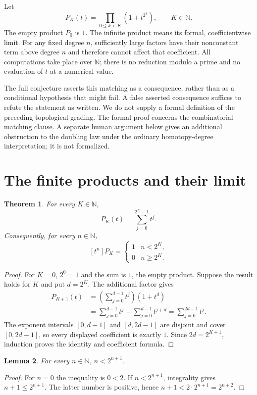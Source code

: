 \documentclass[11pt]{article}
\newtheorem{theorem}{Theorem}
\newtheorem{lemma}[theorem]{Lemma}
\newcommand{\N}{\mathbb{N}}
\newcommand{\coeff}[2]{[t^{#1}]#2}
\begin{document}
Let
\[
P_K(t)=\prod_{0\leq k<K}(1+t^{2^k}),\qquad K\in\N.
\]
The empty product $P_0$ is $1$. The infinite product means its formal, coefficientwise limit. For any fixed degree $n$, sufficiently large factors have their nonconstant term above degree $n$ and therefore cannot affect that coefficient. All computations take place over $\N$; there is no reduction modulo a prime and no evaluation of $t$ at a numerical value.

The full conjecture asserts this matching as a consequence, rather than as a conditional hypothesis that might fail. A false asserted consequence suffices to refute the statement as written. We do not supply a formal definition of the preceding topological grading. The formal proof concerns the combinatorial matching clause. A separate human argument below gives an additional obstruction to the doubling law under the ordinary homotopy-degree interpretation; it is not formalized.

\section{The finite products and their limit}
\begin{theorem}\label{thm:finite}
For every $K\in\N$,
\[
P_K(t)=\sum_{j=0}^{2^K-1}t^j.
\]
Consequently, for every $n\in\N$,
\[
\coeff{n}{P_K}=
\begin{cases}1&n<2^K,\\0&n\geq2^K.\end{cases}
\]
\end{theorem}
\begin{proof}
For $K=0$, $2^0=1$ and the sum is $1$, the empty product. Suppose the result holds for $K$ and put $d=2^K$. The additional factor gives
\begin{align*}
P_{K+1}(t)
 &=\left(\sum_{j=0}^{d-1}t^j\right)(1+t^d)\\
 &=\sum_{j=0}^{d-1}t^j+\sum_{j=0}^{d-1}t^{j+d}
 =\sum_{j=0}^{2d-1}t^j.
\end{align*}
The exponent intervals $[0,d-1]$ and $[d,2d-1]$ are disjoint and cover $[0,2d-1]$, so every displayed coefficient is exactly $1$. Since $2d=2^{K+1}$, induction proves the identity and coefficient formula.
\end{proof}

\begin{lemma}\label{lem:bound}
For every $n\in\N$, $n<2^{n+1}$.
\end{lemma}
\begin{proof}
For $n=0$ the inequality is $0<2$. If $n<2^{n+1}$, integrality gives $n+1\leq2^{n+1}$. The latter number is positive, hence $n+1<2\cdot2^{n+1}=2^{n+2}$.
\end{proof}
\end{document}
